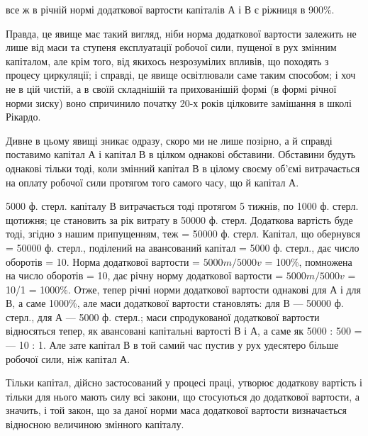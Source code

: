 \parcont{}  %
все ж в річній нормі додаткової вартости капіталів А і В є ріжниця в
900\%.

Правда, це явище має такий вигляд, ніби норма додаткової вартости
залежить не лише від маси та ступеня експлуатації робочої сили,
пущеної в рух змінним капіталом, але крім того, від якихось незрозумілих
впливів, що походять з процесу циркуляції; і справді, це явище
освітлювали саме таким способом; і хоч не в цій чистій, а в своїй складнішій
та прихованішій формі (в формі річної норми зиску) воно спричинило
початку 20-х років цілковите замішання в школі Рікардо.

Дивне в цьому явищі зникає одразу, скоро ми не лише позірно, а
й справді поставимо капітал А і капітал В в цілком однакові обставини.
Обставини будуть однакові тільки тоді, коли змінний капітал В в цілому
своєму об’ємі витрачається на оплату робочої сили протягом того
самого часу, що й капітал А.

5000 ф. стерл. капіталу В витрачається тоді протягом 5 тижнів, по
1000 ф. стерл. щотижня; це становить за рік витрату в 50000 ф. стерл.
Додаткова вартість буде тоді, згідно з нашим припущенням, теж = 50000
ф. стерл. Капітал, що обернувся = 50000 ф. стерл., поділений на авансований
капітал = 5000 ф. стерл., дає число оборотів = 10. Норма додаткової
вартости = $5000 m / 5000 v$ = 100\%, помножена на число оборотів = 10, дає річну норму додаткової
вартости = $5000 m / 5000 v$ = 10/1 = 1000\%. Отже, тепер річні норми додаткової вартости однакові для
А і для В, а саме
1000\%, але маси додаткової вартости становлять: для В — 50000 ф. стерл.,
для А — 5000 ф. стерл.; маси спродукованої додаткової вартости відносяться
тепер, як авансовані капітальні вартості В і А, а саме як 5000 : 500 =
— 10 : 1. Але зате капітал В в той самий час пустив у рух удесятеро
більше робочої сили, ніж капітал А.

Тільки капітал, дійсно застосований у процесі праці, утворює додаткову
вартість і тільки для нього мають силу всі закони, що стосуються
до додаткової вартости, а значить, і той закон, що за даної норми маса
додаткової вартости визначається відносною величиною змінного капіталу.

